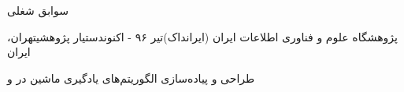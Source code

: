 \documentclass{resume} %
\begin{document}
\begin{rSection}{سوابق شغلی}
\def\jobtitle{دستیار پژوهشی}
\def\employername{پژوهشگاه علوم و فناوری اطلاعات ایران (ایرانداک)}
\def\years{تیر ۹۶ - اکنون}
\def\location{تهران، ایران}

\begin{rSubsection}{\employername}{\years}{\jobtitle}{\location}
%	
\item طراحی و پیاده‌سازی الگوریتم‌های یادگیری ماشین در و
\end{rSubsection}

%
\end{rSection}
%
%
%
%	
%	
\end{document}
